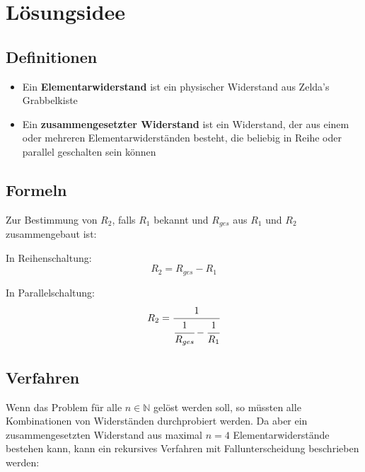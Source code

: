 \documentclass[a4paper,10pt,ngerman]{scrartcl}
\title{\Aufgabe}
\author{\Name\\Team-ID: \TeamId}
\date{\today}
\begin{document}
\maketitle
\tableofcontents

\clearpage

\section{Lösungsidee}

\subsection{Definitionen}
\begin{itemize}
  \item Ein \textbf{Elementarwiderstand} ist ein physischer Widerstand aus Zelda's Grabbelkiste
  \item Ein \textbf{zusammengesetzter Widerstand} ist ein Widerstand, der aus einem oder mehreren Elementarwiderständen besteht, die beliebig in Reihe oder parallel geschalten sein können
\end{itemize}

\subsection{Formeln}
Zur Bestimmung von $R_2$, falls $R_1$ bekannt und $R_{ges}$ aus $R_1$ und $R_2$ zusammengebaut ist:
\vspace{10pt}

In Reihenschaltung:
$$R_2 = R_{ges} - R_1$$ 

In Parallelschaltung:
$$R_2 = \cfrac{1}{\cfrac{1}{R_{ges}} - \cfrac{1}{R_1}}$$ 

\subsection{Verfahren}
Wenn das Problem für alle $n \in \mathbb{N}$ gelöst werden soll, so müssten alle Kombinationen von Widerständen durchprobiert werden. Da aber ein zusammengesetzten Widerstand aus maximal $n = 4$ Elementarwiderstände bestehen kann,
kann ein rekursives Verfahren mit Fallunterscheidung beschrieben werden:
\end{document}
